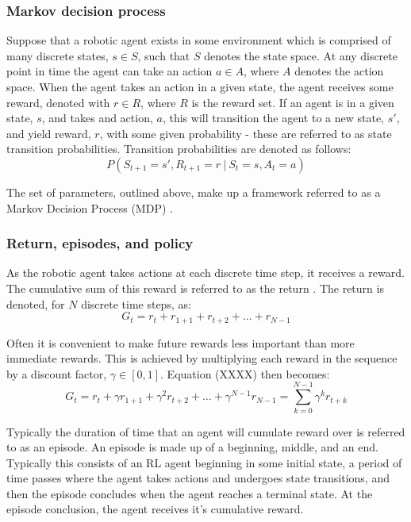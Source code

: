 \subsubsection{Markov decision process}
Suppose that a robotic agent exists in some environment which is comprised of many discrete states, $s \in S$, such that $S$ denotes the state space. At any discrete point in time the agent can take an action $a \in A$, where $A$ denotes the action space. When the agent takes an action in a given state, the agent receives some reward, denoted with $r \in R$, where $R$ is the reward set. If an agent is in a given state, $s$, and takes and action, $a$, this will transition the agent to a new state, $s'$, and yield reward, $r$, with some given probability - these are referred to as state transition probabilities. Transition probabilities are denoted as follows:
\begin{equation}
P(S_{t+1}=s', R_{t+1}=r \ | \ S_t = s, A_t = a)
\end{equation}

The set of parameters, outlined above, make up a framework referred to as a Markov Decision Process (MDP) \cite{Sutton2018}.

\subsubsection{Return, episodes, and policy}
As the robotic agent takes actions at each discrete time step, it receives a reward. The cumulative sum of this reward is referred to as the return \cite{Sutton2018}. The return is denoted, for $N$ discrete time steps, as:
\begin{equation}
G_t = r_t + r_{1+1} + r_{t+2} + \ldots + r_{N-1}
\end{equation}

Often it is convenient to make future rewards less important than more immediate rewards. This is achieved by multiplying each reward in the sequence by a discount factor, $\gamma \in [0,1]$. Equation (XXXX) then becomes:
\begin{equation}
G_t = r_t + \gamma r_{1+1} + \gamma^2 r_{t+2} + \ldots + \gamma^{N-1} r_{N-1} = \sum_{k = 0}^{N-1} \gamma^k r_{t+k}
\end{equation}

Typically the duration of time that an agent will cumulate reward over is referred to as an episode. An episode is made up of a beginning, middle, and an end. Typically this consists of an RL agent beginning in some initial state, a period of time passes where the agent takes actions and undergoes state transitions, and then the episode concludes when the agent reaches a terminal state. At the episode conclusion, the agent receives it's cumulative reward.

